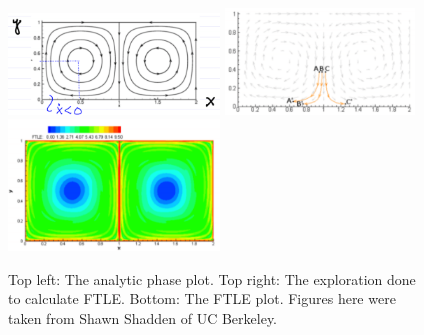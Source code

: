 \begin{ex}
\begin{figure}[h!]
	\centering
	\includegraphics[width=0.5\textwidth]{figures/ch1/11contour_phase.png}
	\hspace{0.03\textwidth}
	\includegraphics[width=0.45\textwidth]{figures/ch1/12ftle_exploration.png}
	\includegraphics[width=0.5\textwidth]{figures/ch1/13ftle_final.png}
	\caption{Top left: The analytic phase plot. Top right: The exploration done to calculate FTLE. Bottom: The FTLE plot. Figures here were taken from Shawn Shadden of UC Berkeley.} \label{fig:FTLE_double_gyre}
\end{figure}
\end{ex}

